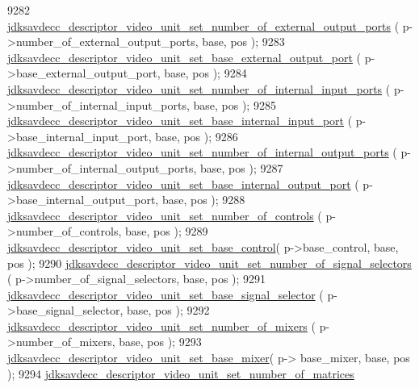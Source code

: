 \begin{DoxyCode}
9282         \hyperlink{group__descriptor__video_ga81d988f00d6518078981013f3d9f5492}{jdksavdecc\_descriptor\_video\_unit\_set\_number\_of\_external\_output\_ports}
      ( p->number\_of\_external\_output\_ports, base, pos );
9283         \hyperlink{group__descriptor__video_ga45869bc92e896678bcdb4510680ad1d7}{jdksavdecc\_descriptor\_video\_unit\_set\_base\_external\_output\_port}
      ( p->base\_external\_output\_port, base, pos );
9284         \hyperlink{group__descriptor__video_gabe26a58af79c40668681bfec808a5641}{jdksavdecc\_descriptor\_video\_unit\_set\_number\_of\_internal\_input\_ports}
      ( p->number\_of\_internal\_input\_ports, base, pos );
9285         \hyperlink{group__descriptor__video_ga8f11f3bbc432e33c861962027b0fc2f0}{jdksavdecc\_descriptor\_video\_unit\_set\_base\_internal\_input\_port}
      ( p->base\_internal\_input\_port, base, pos );
9286         \hyperlink{group__descriptor__video_gaadfcaa48da3e80f92841c82bb0b3926b}{jdksavdecc\_descriptor\_video\_unit\_set\_number\_of\_internal\_output\_ports}
      ( p->number\_of\_internal\_output\_ports, base, pos );
9287         \hyperlink{group__descriptor__video_ga5fbf31a824651ca8a4a379e8457f13dd}{jdksavdecc\_descriptor\_video\_unit\_set\_base\_internal\_output\_port}
      ( p->base\_internal\_output\_port, base, pos );
9288         \hyperlink{group__descriptor__video_ga3a3d80d342ac30f0b9932f327e2e7c5b}{jdksavdecc\_descriptor\_video\_unit\_set\_number\_of\_controls}
      ( p->number\_of\_controls, base, pos );
9289         \hyperlink{group__descriptor__video_gaa89ae6165083b03489a41d45b46b31f6}{jdksavdecc\_descriptor\_video\_unit\_set\_base\_control}(
       p->base\_control, base, pos );
9290         \hyperlink{group__descriptor__video_ga0d8fc591be9f06ba5718345ce0dbb718}{jdksavdecc\_descriptor\_video\_unit\_set\_number\_of\_signal\_selectors}
      ( p->number\_of\_signal\_selectors, base, pos );
9291         \hyperlink{group__descriptor__video_ga79808fe9208b55f021685d15f68aa637}{jdksavdecc\_descriptor\_video\_unit\_set\_base\_signal\_selector}
      ( p->base\_signal\_selector, base, pos );
9292         \hyperlink{group__descriptor__video_ga9e304726044e3fc3bdc586592e756ab6}{jdksavdecc\_descriptor\_video\_unit\_set\_number\_of\_mixers}
      ( p->number\_of\_mixers, base, pos );
9293         \hyperlink{group__descriptor__video_ga81231bc2fa0ae453cd4dfb698fefe675}{jdksavdecc\_descriptor\_video\_unit\_set\_base\_mixer}( p->
      base\_mixer, base, pos );
9294         \hyperlink{group__descriptor__video_ga7da655cb88e8cf2b3a12ead76adcb922}{jdksavdecc\_descriptor\_video\_unit\_set\_number\_of\_matrices}

\end{DoxyCode}
